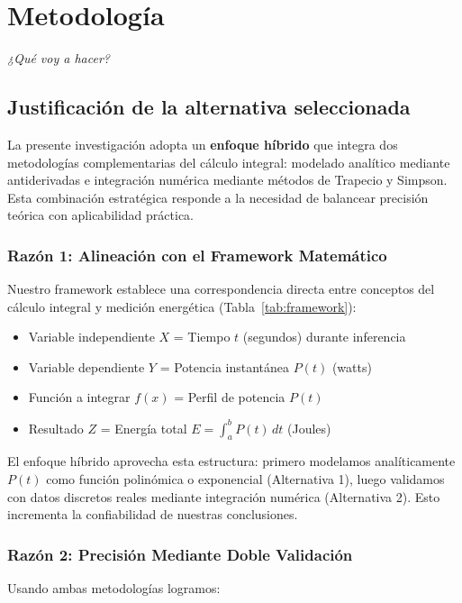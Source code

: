 \section{Metodología}
\textit{¿Qué voy a hacer?}

\subsection{Justificación de la alternativa seleccionada}

La presente investigación adopta un \textbf{enfoque híbrido} que integra dos metodologías complementarias del cálculo integral: modelado analítico mediante antiderivadas e integración numérica mediante métodos de Trapecio y Simpson. Esta combinación estratégica responde a la necesidad de balancear precisión teórica con aplicabilidad práctica.

\subsubsection*{Razón 1: Alineación con el Framework Matemático}

Nuestro framework establece una correspondencia directa entre conceptos del cálculo integral y medición energética (Tabla~\ref{tab:framework}):

\begin{itemize}
    \item Variable independiente $X$ = Tiempo $t$ (segundos) durante inferencia
    \item Variable dependiente $Y$ = Potencia instantánea $P(t)$ (watts)
    \item Función a integrar $f(x)$ = Perfil de potencia $P(t)$
    \item Resultado $Z$ = Energía total $E = \int_a^b P(t)\,dt$ (Joules)
\end{itemize}

El enfoque híbrido aprovecha esta estructura: primero modelamos analíticamente $P(t)$ como función polinómica o exponencial (Alternativa 1), luego validamos con datos discretos reales mediante integración numérica (Alternativa 2). Esto incrementa la confiabilidad de nuestras conclusiones.

\subsubsection*{Razón 2: Precisión Mediante Doble Validación}

Usando ambas metodologías logramos:

